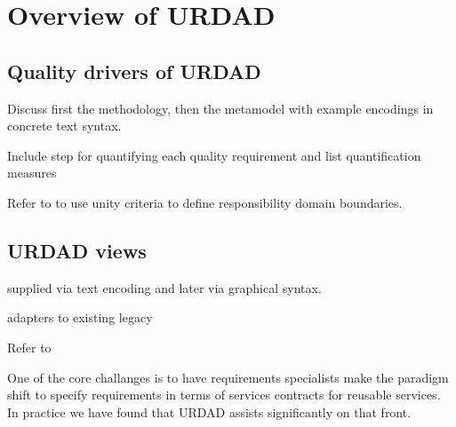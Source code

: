 \section{Overview of URDAD}

\subsection{Quality drivers of URDAD}

Discuss first the methodology, then the metamodel with example encodings in concrete text syntax.

Include step for quantifying each quality requirement and list quantification measures

Refer to \cite{gonzalez_unity_2009} to use unity criteria to define responsibility domain boundaries.

\subsection{URDAD views}

supplied via text encoding and later via graphical syntax.


adapters to existing legacy


Refer to \cite{wirfs-brock_object-oriented_1989}

One of the core challanges is to have requirements specialists make the paradigm shift to specify requirements in terms of services contracts for reusable services\cite{haines_impact_2007}. In practice we have found that URDAD assists significantly on that front.

